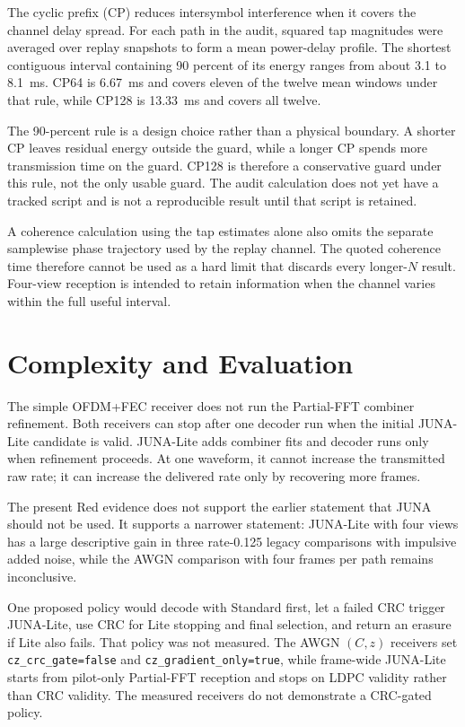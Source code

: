 \documentclass[11pt]{article}
\begin{document}
The cyclic prefix (CP) reduces intersymbol interference when it covers the
channel delay spread.  For each path in the audit, squared tap magnitudes were
averaged over replay snapshots to form a mean power-delay profile.  The
shortest contiguous interval containing 90 percent of its energy ranges from
about 3.1 to 8.1~ms.  CP64 is 6.67~ms and covers eleven of the twelve mean
windows under that rule, while CP128 is 13.33~ms and covers all twelve.

The 90-percent rule is a design choice rather than a physical boundary.  A
shorter CP leaves residual energy outside the guard, while a longer CP spends
more transmission time on the guard.  CP128 is therefore a conservative guard
under this rule, not the only usable guard.  The audit calculation does not yet
have a tracked script and is not a reproducible result until that script is
retained.

A coherence calculation using the tap estimates alone also omits the separate
samplewise phase trajectory used by the replay channel.  The quoted coherence time therefore
cannot be used as a hard limit that discards every longer-$N$ result.  Four-view
reception is intended to retain information when the channel varies within the
full useful interval.

\section{Complexity and Evaluation}

The simple OFDM+FEC receiver does not run the Partial-FFT combiner refinement.
Both receivers can stop after one decoder run when the initial JUNA-Lite
candidate is valid.  JUNA-Lite adds combiner fits and decoder runs only when
refinement proceeds.  At one waveform, it cannot increase the transmitted raw
rate; it can increase the delivered rate only by recovering more frames.

The present Red evidence does not support the earlier statement that JUNA
should not be used.  It supports a narrower statement: JUNA-Lite with four
views has a large descriptive gain in three rate-0.125 legacy comparisons
with impulsive added noise, while the AWGN comparison with four frames per
path remains inconclusive.

One proposed policy would decode with Standard first, let a failed CRC trigger
JUNA-Lite, use CRC for Lite stopping and final selection, and return an erasure
if Lite also fails.  That policy was not measured.  The AWGN $(C,z)$ receivers
set \texttt{cz\_crc\_gate=false} and \texttt{cz\_gradient\_only=true}, while
frame-wide JUNA-Lite starts from pilot-only Partial-FFT reception and stops on
LDPC validity rather than CRC validity.  The measured receivers do not
demonstrate a CRC-gated policy.
\end{document}
